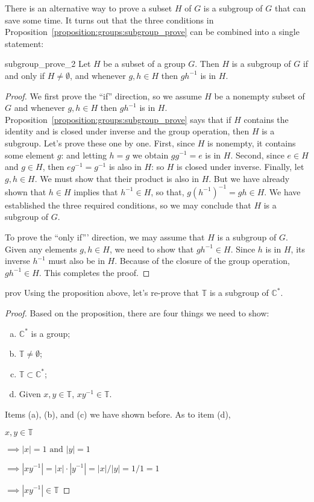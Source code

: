 There is an alternative way to prove a subset $H$ of $G$ is a subgroup of $G$ that  can save some time.  It turns out that the three conditions in Proposition~\ref{proposition:groups:subgroup_prove} can be combined into a single statement:

\begin{prop}{subgroup_prove_2}
Let $H$ be a subset of a group $G$.  Then $H$ is a subgroup of $G$ if and only if $H \neq \emptyset$, and whenever $g, h \in H$ then $gh^{-1}$ is in $H$. 
\end{prop}
 
 
\begin{proof}
We first prove the ``if'' direction, so we assume $H$ be a nonempty subset of $G$ and whenever $g, h \in H$ then $gh^{-1}$ is in $H$. Proposition~\ref{proposition:groups:subgroup_prove} says that if $H$ contains the identity and is closed under inverse and the group operation, then $H$ is a subgroup. Let's prove these one by one. First, since $H$ is nonempty, it contains some element $g$: and letting $h=g$ we obtain $gg^{-1} = e$ is in $H$.  Second, since $e \in H$ and  $g \in H$, then $eg^{-1} = g^{-1}$ is also in $H$: so $H$ is closed under inverse.  Finally, let $g, h \in H$. We must show that their product is also in $H$.  But we have already shown that $h \in H$ implies that $h^{-1} \in H$, so that, $g(h^{-1})^{-1} = gh \in H$.  We have established the three required conditions, so we may conclude that  $H$ is a subgroup of $G$.

To prove the ``only  if''' direction, we may assume that $H$ is a subgroup of $G$. Given any elements $g, h \in H$, we need to show that $gh^{-1} \in H$.  Since $h$ is in $H$, its inverse $h^{-1}$ must also be in $H$.  Because of the closure of the group operation, $gh^{-1} \in H$. This completes the proof. 
\end{proof}

\begin{example}{prov}
Using the proposition above, let's re-prove that ${\mathbb T}$ is a subgroup of ${\mathbb C}^{\ast}$.

\begin{proof}
Based on the proposition, there are four things we need to show:
\begin{enumerate}[(a)]
\item
${\mathbb C}^{\ast}$ is a group; 
\item
${\mathbb T} \neq \emptyset$; 
\item
${\mathbb T} \subset {\mathbb C}^{\ast}$; 
\item
Given $x, y \in {\mathbb T}$, $xy^{-1} \in {\mathbb T}$.
\end{enumerate}

\noindent
Items (a), (b), and (c) we have shown before. As to item (d), 

$x, y \in {\mathbb T}$

$\implies |x|=1 \mbox{ and } |y|=1$

$\implies |xy^{-1}|= |x|\cdot|y^{-1}| = |x|/|y| = 1/1 = 1$

$\implies |xy^{-1}| \in {\mathbb T}$

\end{proof}
\end{example} 

